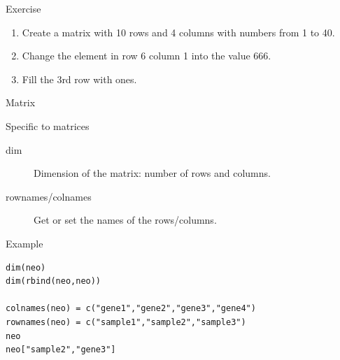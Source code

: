 \documentclass[10pt]{beamer}
\begin{document}
\begin{frame}{Exercise}
  \begin{enumerate}
  \item Create a {\sf matrix} with 10 rows and 4 columns with numbers from 1 to 40. 
  \item Change the element in row 6 column 1 into the value 666.
  \item Fill the 3rd row with ones.
  \end{enumerate}
\end{frame}


\begin{frame}[fragile, shrink=5]{Matrix}
  \begin{block}{Specific to matrices}
    \begin{description}
    \item[dim] Dimension of the {\sf matrix}: number of rows and columns.
    \item[rownames/colnames] Get or set the names of the rows/columns.
    \end{description}    
  \end{block}
  \begin{exampleblock}{Example}
\begin{verbatim}
dim(neo)
dim(rbind(neo,neo))

colnames(neo) = c("gene1","gene2","gene3","gene4")
rownames(neo) = c("sample1","sample2","sample3")
neo
neo["sample2","gene3"]
\end{verbatim}
  \end{exampleblock}
\end{frame}

\end{document}
